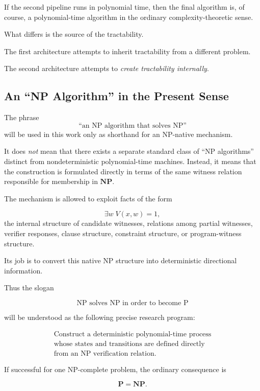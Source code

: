 \documentclass[11pt]{article}
\theoremstyle{plain}
\theoremstyle{definition}
\begin{document}
If the second pipeline runs in polynomial time, then the final algorithm is,
of course, a polynomial-time algorithm in the ordinary complexity-theoretic
sense.

What differs is the source of the tractability.

The first architecture attempts to inherit tractability from a different
problem.

The second architecture attempts to \emph{create tractability internally}.

\subsection{An ``NP Algorithm'' in the Present Sense}

The phrase
\[
    \text{``an NP algorithm that solves NP''}
\]
will be used in this work only as shorthand for an NP-native mechanism.

It does \emph{not} mean that there exists a separate standard class of
``NP algorithms'' distinct from nondeterministic polynomial-time machines.
Instead, it means that the construction is formulated directly in terms of
the same witness relation responsible for membership in \(\mathbf{NP}\).

The mechanism is allowed to exploit facts of the form

\[
    \exists w\;V(x,w)=1,
\]
the internal structure of candidate witnesses, relations among partial
witnesses, verifier responses, clause structure, constraint structure, or
program-witness structure.

Its job is to convert this native NP structure into deterministic directional
information.

Thus the slogan

\[
\boxed{
\text{NP solves NP in order to become P}
}
\]

will be understood as the following precise research program:

\[
\boxed{
\begin{array}{c}
\text{Construct a deterministic polynomial-time process}\\
\text{whose states and transitions are defined directly}\\
\text{from an NP verification relation.}
\end{array}
}
\]

If successful for one NP-complete problem, the ordinary consequence is

\[
    \mathbf{P}=\mathbf{NP}.
\]
\end{document}
